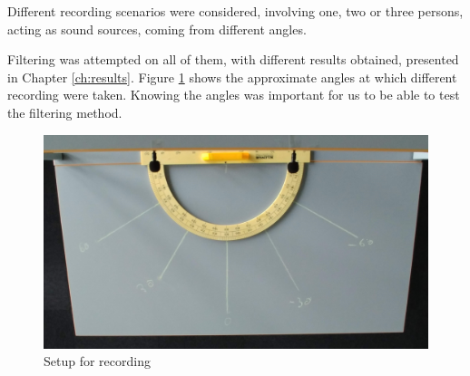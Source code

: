 Different recording scenarios were considered, involving one, two or three persons, acting as sound sources,
coming from different angles.

Filtering was attempted on all of them, with different results obtained, presented in Chapter \ref{ch:results}.
\newpage
Figure \ref{fig:recSetup} shows the approximate angles at which different recording were taken. Knowing the 
angles was important for us to be able to test the filtering method.

\begin{figure}[htp]
	\centering
	\includegraphics[width=1\textwidth]{Illustrations/JustSetup.jpg}
	\caption{Setup for recording}
	\label{fig:recSetup}
\end{figure}



 

